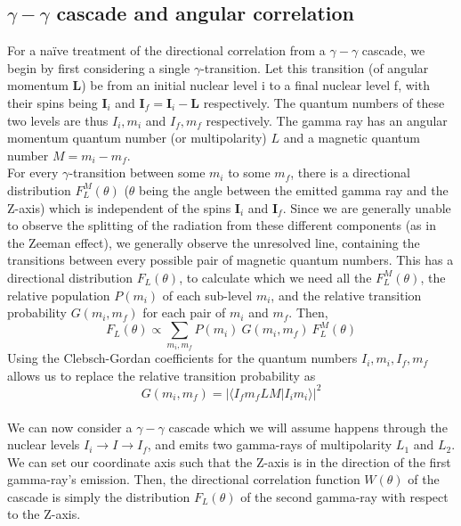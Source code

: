 \subsection{$\gamma-\gamma$ cascade and angular correlation}

For a naïve treatment of the directional correlation from a $\gamma-\gamma$ cascade, we begin by first considering a single $\gamma$-transition. Let this transition (of angular momentum $\textbf{L}$) be from an initial nuclear level i to a final nuclear level f, with their spins being $\textbf{I}_i$ and $\textbf{I}_f = \textbf{I}_i - \textbf{L}$ respectively. The quantum numbers of these two levels are thus $I_i, m_i$ and $I_f, m_f$ respectively. The gamma ray has an angular momentum quantum number (or multipolarity) $L$ and a magnetic quantum number $M = m_i-m_f$.\\

For every $\gamma$-transition between some $m_i$ to some $m_f$, there is a directional distribution $F_L^M(\theta)$ ($\theta$ being the angle between the emitted gamma ray and the Z-axis) which is independent of the spins $\textbf{I}_i$ and $\textbf{I}_f$. Since we are generally unable to observe the splitting of the radiation from these different components (as in the Zeeman effect), we generally observe the unresolved line, containing the transitions between every possible pair of magnetic quantum numbers. This has a directional distribution $F_L(\theta)$, to calculate which we need all the $F_L^M(\theta)$, the relative population $P(m_i)$ of each sub-level $m_i$, and the relative transition probability $G(m_i, m_f)$ for each pair of $m_i$ and $m_f$. Then,
$$F_L(\theta) \propto \sum_{m_i,m_f} P(m_i) \ G(m_i,m_f) \ F_L^M(\theta)$$
Using the Clebsch-Gordan coefficients for the quantum numbers $I_i, m_i, I_f, m_f$ allows us to replace the relative transition probability as
$$G(m_i, m_f) = |\langle I_fm_fLM|I_im_i \rangle|^2$$\\

We can now consider a $\gamma-\gamma$ cascade which we will assume happens through the nuclear levels $I_i \rightarrow I \rightarrow I_f$, and emits two gamma-rays of multipolarity $L_1$ and $L_2$. We can set our coordinate axis such that the Z-axis is in the direction of the first gamma-ray's emission. Then, the directional correlation function $W(\theta)$ of the cascade is simply the distribution $F_L(\theta)$ of the second gamma-ray with respect to the Z-axis.\\

